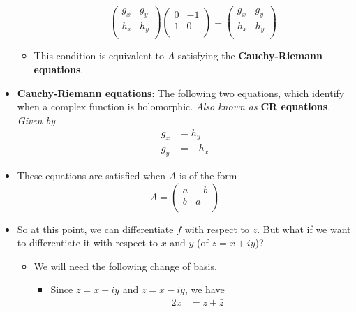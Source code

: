 \documentclass[../notes.tex]{subfiles}
\begin{document}
\begin{itemize}
\begin{itemize}
\begin{equation*}
            \begin{pmatrix}
                g_x & g_y\\
                h_x & h_y\\
            \end{pmatrix}
            \begin{pmatrix}
                0 & -1\\
                1 & 0\\
            \end{pmatrix}
            =
            \begin{pmatrix}
                g_x & g_y\\
                h_x & h_y\\
            \end{pmatrix}
        \end{equation*}
        \item This condition is equivalent to $A$ satisfying the \textbf{Cauchy-Riemann equations}.
    \end{itemize}
    \item \textbf{Cauchy-Riemann equations}: The following two equations, which identify when a complex function is holomorphic. \emph{Also known as} \textbf{CR equations}. \emph{Given by}
    \begin{align*}
        g_x &= h_y\\
        g_y &= -h_x
    \end{align*}
    \item These equations are satisfied when $A$ is of the form
    \begin{equation*}
        A =
        \begin{pmatrix}
            a & -b\\
            b & a\\
        \end{pmatrix}
    \end{equation*}
    \item So at this point, we can differentiate $f$ with respect to $z$. But what if we want to differentiate it with respect to $x$ and $y$ (of $z=x+iy$)?
    \begin{itemize}
        \item We will need the following change of basis.
        \begin{itemize}
            \item Since $z=x+iy$ and $\bar{z}=x-iy$, we have
            \begin{align*}
                2x &= z+\bar{z}&

\end{align*}
\end{itemize}
\end{itemize}
\end{itemize}
\end{document}
